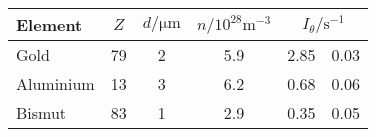 \label{tab:tabZWerte}
	\begin{tabular}{lS[table-format=2.0]S[table-format=1.0]S[table-format=1.1]S[table-format=1.2]@{${}\pm{}$}S[table-format=1.2]}
		\toprule
		{Element} & {$Z$} & {$d/\si{\micro\metre}$} & {$n/10^{28}\si{\metre^{-3}}$} &  \\
		\midrule
		{Gold} & 79 & 2 & 5.9 & 2.85 & 0.03 \\
		{Aluminium} & 13 & 3 & 6.2 & 0.68 & 0.06 \\
		{Bismut} & 83 & 1 & 2.9 & 0.35 & 0.05 \\
		\bottomrule
	\end{tabular}
